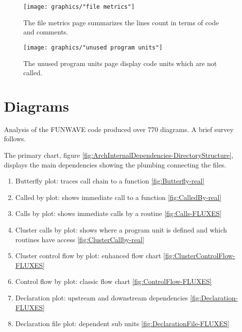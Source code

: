 \documentclass[11pt, oneside]{article}   	%
\begin{document}
\begin{figure}[htbp] %
   \centering
   \texttt{[image: graphics/"file metrics"]} 
   \caption{The file metrics page summarizes the lines count in terms of code and comments.}
   \label{fig:file metrics}
\end{figure}

\begin{figure}[htbp] %
   \centering
   \texttt{[image: graphics/"unused program units"]} 
   \caption{The unused program units page display code units which are not called.}
   \label{fig:unused program units}
\end{figure}

\break
\section{Diagrams}  %
Analysis of the FUNWAVE code produced over 770 diagrams. A brief survey follows.

The primary chart, figure \ref{fig:ArchInternalDependencies-DirectoryStructure}, displays the main dependencies showing the plumbing connecting the files.

\begin{enumerate}
\item Butterfly plot: traces call chain to a function \ref{fig:Butterfly-real}
\item Called by plot: shows immediate call to a function \ref{fig:CalledBy-real}
\item Calls by plot: shows immediate calls by a routine \ref{fig:Calls-FLUXES}
\item Cluster calls by plot: shows where a program unit is defined and which routines have access \ref{fig:ClusterCallby-real}
\item Cluster control flow by plot: enhanced flow chart \ref{fig:ClusterControlFlow-FLUXES}
\item Control flow by plot: classic flow chart \ref{fig:ControlFlow-FLUXES}
\item Declaration plot: upstream and downstream dependencies \ref{fig:Declaration-FLUXES}
\item Declaration file plot: dependent sub units \ref{fig:DeclarationFile-FLUXES}
\end{enumerate}
\end{document}
